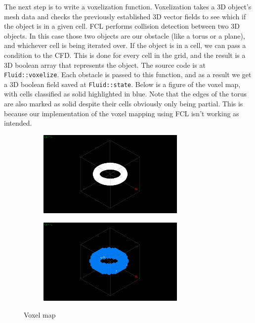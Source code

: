 \documentclass[a4paper,12pt]{article}
\begin{document}
The next step is to write a voxelization function. Voxelization takes a 3D
object's mesh data and checks the previously established 3D vector fields to see which
if the object is in a given cell. FCL performs collision detection between two 3D objects.
In this case those two objects are our obstacle (like a torus or a plane), and
whichever cell is being iterated over. If the object is in a cell, we can pass a
condition to the CFD. This is done for every cell in the grid, and the result
is a 3D boolean array that represents the object. The source code is at \lstinline{Fluid::voxelize}.
Each obstacle is passed to this function, and as a result we get a 3D boolean
field saved at \lstinline{Fluid::state}. Below is a figure of the voxel map,
with cells classified as solid highlighted in blue. Note that the edges of the
torus are also marked as solid despite their cells obviously only being partial.
This is because our implementation of the voxel mapping using FCL isn't working
as intended.

\begin{figure}[H]
    \centering
    \begin{subfigure}[t]{0.45\textwidth}
        \centering
        \includegraphics[height=1.65in]{resources/voxelize1.png}
		\caption{}
    \end{subfigure}
    \hfill
    \begin{subfigure}[t]{0.45\textwidth}
        \centering
        \includegraphics[height=1.65in]{resources/voxelize2.png}
		\caption{}
		\label{fig:voxelmap}
	\end{subfigure} 
    \caption{Voxel map}
\end{figure}
\end{document}
